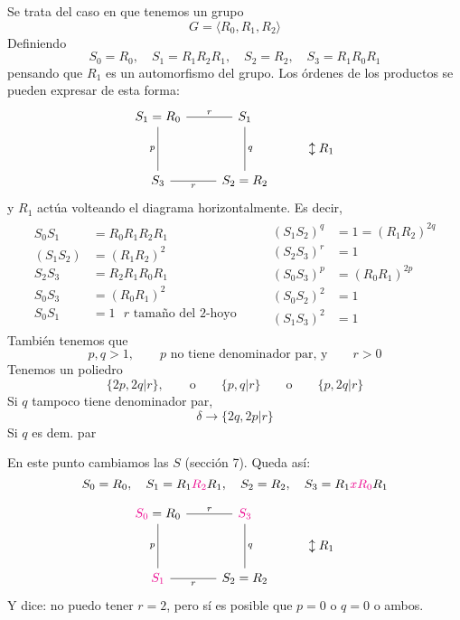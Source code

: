 \documentclass[spanish]{article}
\theoremstyle{definition}
\begin{document}
Se trata del caso en que tenemos un grupo
\[G=\langle R_0,R_1,R_2\rangle\]
Definiendo
\[S_0=R_0,\quad S_1=R_1R_2R_1,\quad S_2=R_2,\quad S_3=R_1R_0R_1\]
pensando que $R_1$ es un automorfismo del grupo. Los órdenes de los productos se pueden expresar de esta forma:
\[\begin{tikzcd}[row sep=small]
	S_1=R_0\arrow[r,no head,"r"]\arrow[dd,no head,"p",swap]&S_1\arrow[dd,no head,"q"]\\&&\updownarrow R_1 \\
	S_3\arrow[r,swap,no head,"r"]&S_2=R_2
\end{tikzcd}\]
y $R_1$ actúa volteando el diagrama horizontalmente. Es decir,
\begin{align*}
	\begin{aligned}
		S_0S_1&=R_0R_1R_2R_1\\
	(S_1S_2)&=(R_1R_2)^2\\
	S_2S_3&=R_2R_1R_0R_1\\
	S_0S_3&=(R_0R_1)^2\\
	S_0S_1&=1\text{ $r$ tamaño del 2-hoyo}\qquad
		\end{aligned}
		\begin{aligned}
	(S_1S_2)^q&=1=(R_1R_2)^{2q}\\
	(S_2S_3)^r&=1\\
	(S_0S_3)^p&=(R_0R_1)^{2p}\\
	(S_0S_2)^2&=1\\
	(S_1S_3)^2&=1
		\end{aligned}
\end{align*}
También tenemos que
\[p,q>1,\qquad p\text{ no tiene denominador par, y}\qquad r>0\]
Tenemos un poliedro
\[\{2p,2q|r\},\qquad \text{o} \qquad \{p,q|r\}\qquad \text{o}\qquad \{p,2q|r\}\]
Si $q$ tampoco tiene denominador par,
\[\delta\to\{2q,2p|r\}\]
Si $q$ es dem. par

\vspace{.5cm}
En este punto cambiamos las $S$ (sección 7). Queda así:
\[S_0=R_0,\quad S_1=R_1{\color{magenta}R_2}R_1,\quad S_2=R_2,\quad S_3=R_1{\color{magenta}xR_0}R_1\]

\[\begin{tikzcd}[row sep=small]
	{\color{magenta}S_0}=R_0\arrow[r,no head,"r"]\arrow[dd,no head,"p",swap]&{\color{magenta}S_3}\arrow[dd,no head,"q"]\\&&\updownarrow R_1 \\
	{\color{magenta}S_1}\arrow[r,swap,no head,"r"]&S_2=R_2
\end{tikzcd}\]
Y dice: no puedo tener $r=2$, pero sí es posible que $p=0$ o $q=0$ o ambos.
\end{document}
